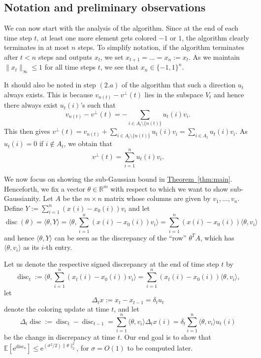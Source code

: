 \documentclass[11pt]{article}
\numberwithin{equation}{section}
\theoremstyle{definition}
\theoremstyle{plain}
\newcommand{\R}{\mathbb R}
\newcommand{\eee}{\mathrm e}
\newcommand{\expref}[2]{\hyperref[#2]{#1~\ref{#2}}}
\newcommand\E{\mathbb{E}}
\DeclareMathOperator{\disc}{disc}   %
\begin{document}
%
\subsection{Notation and preliminary observations}    %
We can now start with the analysis of the algorithm. Since at the end of each
time step $t$, at least one more element gets colored $-1$ or $1$, the algorithm
clearly terminates in at most $n$ steps. To simplify
%
notation,     %
if the algorithm
terminates after $t<n$ steps and outputs $x_t$, we set $x_{t+1}=\ldots=x_n := x_t$.
As we maintain $\| x_t\|_{\infty} \leq 1$ for all time steps $t$, we see that $x_n\in \{-1,1\}^n$.

It should also be noted in step $(2.a)$ of the algorithm that such a direction $u_t$ always exists. This is because $v_{n(t)}-v^{\perp}(t)$ lies in the subspace $V_t$ and hence there always exist $u_t(i)$'s such that
\[ v_{n(t)}-v^{\perp}(t) = -\sum_{i\in A_t \setminus \{n(t)\}} u_t(i) v_i.\]
This then gives $v^{\perp}(t) = v_{n(t)} + \sum_{i\in A_t \setminus \{n(t)\}} u_t(i) v_i = \sum_{i \in A_t}  u_t(i) v_i$. As $u_t(i)=0$ if $i \notin A_t$, we obtain that
\begin{equation}\label{eq:disc_update_t}
v^{\perp}(t)=\sum_{i=1}^n u_t(i) v_i.
\end{equation}

We now focus on showing the sub-Gaussian bound in \expref{Theorem}{thm:main}.
Henceforth, we fix a vector $\theta \in \R^m$ with respect to which we want to show
sub-Gaussianity. Let $A$ be the $m \times n$ matrix whose columns are given by
$v_1,\ldots,v_n$. Define $Y := \sum_{i=1}^n (x(i)-x_0(i))v_i$ and let
\[\disc(\theta)=\langle \theta,Y \rangle =   \langle \theta,\sum_{i=1}^n (x(i)-x_0(i)) v_i \rangle = \sum_{i=1}^n (x(i)-x_0(i)) \langle \theta,v_i \rangle \]
 and hence $\langle \theta,Y \rangle $ can be seen as the discrepancy of the ``row'' $\theta^TA$, which has $\langle \theta,v_i \rangle$ as its $i$-th entry.




Let us denote the respective signed discrepancy
at the end of time step $t$ by
\[
\disc_t := \langle \theta, \sum_{i=1}^n  (x_t(i)-x_0(i)) v_i\rangle =
\sum_{i=1}^n  (x_t(i)-x_0(i))\langle \theta,v_i  \rangle,
\]
let
\[
\Delta_t x := x_t - x_{t-1} = \delta_t u_t
\]
denote the coloring update at time $t$, and let
\[
\Delta_t \disc := \disc_t - \disc_{t-1} = \sum_{i=1}^n \langle \theta,v_i  \rangle \Delta_t x(i)
= \delta_t \sum_{i=1}^n \langle \theta, v_i \rangle u_t(i)
\]
be the change in discrepancy at time $t$. Our end goal
is to show that $\E[\eee^{\disc_n}] \leq \eee^{(\sigma^2/2) \|\theta\|_2^2}$, for $\sigma
= O(1)$ to be computed later.
\end{document}
